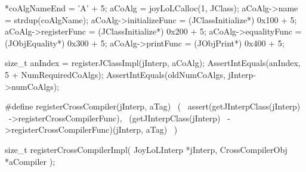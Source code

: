   *coAlgNameEnd          = 'A' + 5;
  aCoAlg                 = joyLoLCalloc(1, JClass);
  aCoAlg->name           = strdup(coAlgName);
  aCoAlg->initializeFunc = (JClassInitialize*) 0x100 + 5;
  aCoAlg->registerFunc   = (JClassInitialize*) 0x200 + 5;
  aCoAlg->equalityFunc   = (JObjEquality*)     0x300 + 5;
  aCoAlg->printFunc      = (JObjPrint*)        0x400 + 5;
  
  size_t anIndex = registerJClassImpl(jInterp, aCoAlg);
  AssertIntEquals(anIndex, 5 + NumRequiredCoAlgs);
  AssertIntEquals(oldNumCoAlgs, jInterp->numCoAlgs);
\stopCTest
\stopTestCase
\stopTestSuite

\startTestSuite[registerCrossCompiler]

\startCHeader
#define registerCrossCompiler(jInterp, aTag)      \
  (                                               \
    assert(getJInterpClass(jInterp)               \
      ->registerCrossCompilerFunc),               \
    (getJInterpClass(jInterp)                     \
      ->registerCrossCompilerFunc)(jInterp, aTag) \
  )
\stopCHeader

\setCHeaderStream{private}
\startCHeader
size_t registerCrossCompilerImpl(
  JoyLoLInterp     *jInterp,
  CrossCompilerObj *aCompiler
);
\stopCHeader
{}

